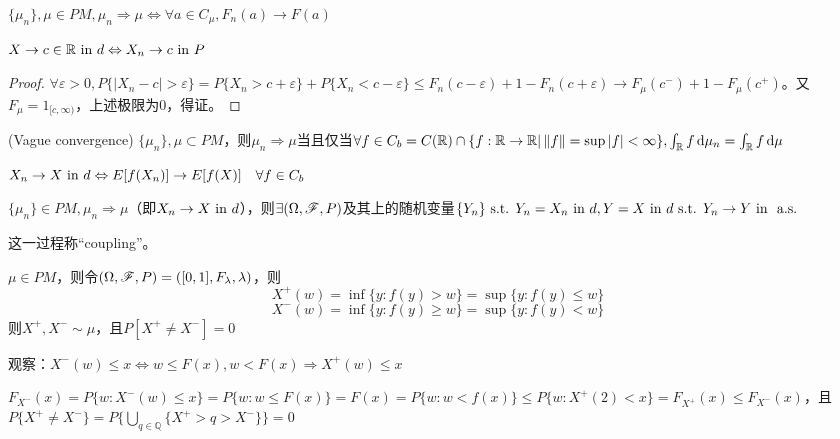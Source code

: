 \documentclass{ctexbook}
\begin{document}
\begin{Cor}
  $\{\mu_{n}\},\mu\in PM,\mu_{n}\Rightarrow \mu\Leftrightarrow \forall a\in C_{\mu}, F_{n}(a)\to F(a)$
\end{Cor}

\begin{Prop}
  $X\to c\in\mathbb{R}\text{ in } d\Leftrightarrow X_{n}\to c\text{ in } P$
\end{Prop}

\begin{proof}
  $\forall\varepsilon>0, P\{|X_{n}-c|>\varepsilon\}=P\{X_{n}>c+\varepsilon\}+P\{X_{n}<c-\varepsilon\}\leq F_{n}(c-\varepsilon)+1-F_{n}(c+\varepsilon)\to F_{\mu}(c^{-})+1-F_{\mu}(c^{+})$。又$F_{\mu}=1_{[c,\infty)}$，上述极限为$0$，得证。
\end{proof}

\begin{Thm}(Vague convergence)
  $\{\mu_{n}\},\mu\subset PM$，则$\mu_{n}\Rightarrow \mu$当且仅当$\forall f\in C_{b}=C(\mathbb{R})\cap \{f:\mathbb{R}\to \mathbb{R} | \left\|f\right\|=\sup|f|<\infty\}, \int_{\mathbb{R}}f\,\mathrm{d}\mu_{n}=\int_{\mathbb{R}}f\,\mathrm{d}\mu$
\end{Thm}

\begin{Cor}
  $X_{n}\to X\text{ in } d\Leftrightarrow E[f(X_{n})]\to E[f(X)]\quad \forall f\in C_{b}$
\end{Cor}

\begin{Thm}
  $\{\mu_{n}\}\in PM, \mu_{n}\Rightarrow \mu$（即$X_{n}\to X\text{ in } d$），则$\exists (\Omega,\mathscr{F},P)$及其上的随机变量$\{Y_{n}\}\text{ s.t. } Y_{n}= X_{n}\text{ in } d, Y=X\text{ in } d\text{ s.t. } Y_{n}\to Y\text{ in } \text{ a.s. }$
\end{Thm}
这一过程称``coupling''。

\begin{Lemma}
  $\mu\in PM$，则令$(\Omega,\mathscr{F},P)=([0,1],F_\lambda,\lambda)$，则
  \[X^{+}(w)=\inf\{y:f(y)>w\}=\sup\{y:f(y)\leq w\}\]
  \[X^{-}(w)=\inf\{y:f(y)\geq w\}=\sup\{y:f(y)<w\}\]
  则$X^{+},X^{-}\sim\mu$，且$P[X^{+}\neq X^{-}]=0$
\end{Lemma}

观察：$X^{-}(w)\leq x\Leftrightarrow w\leq F(x), w<F(x)\Rightarrow X^{+}(w)\leq x$

$F_{X^{-}}(x)=P\{w:X^{-}(w)\leq x\}=P\{w:w\leq F(x)\}=F(x)=P\{w:w<f(x)\}\leq P\{w:X^{+}(2)<x\}=F_{X^{+}}(x)\leq F_{X^{-}}(x)$，且$P\{X^{+}\neq X^{-}\}=P\{\bigcup_{q\in\mathbb{Q}}\{X^{+}>q>X^{-}\}\}=0$
\end{document}

